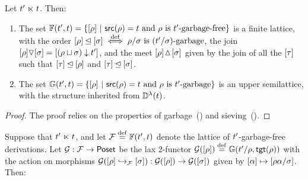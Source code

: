 \begin{proposition}
Let $t' \mathrel{\ltimes} t$. Then:
\begin{enumerate}
\item The set $\mathbb{F}(t', t) = \{{[\rho]} \ |\  \mathsf{src}(\rho) = t \text{ and } \rho \text{ is $t'$-garbage-free}\}$ is a finite lattice,
with the order ${[\rho]} \unlhd {[\sigma]} \overset{\mathrm{def}}{\iff} \rho/\sigma \text{ is $(t'/\sigma)$-garbage}$,
the join ${[\rho]} \triangledown {[\sigma]} = {[(\rho \sqcup \sigma) \downarrow t']}$,
and the meet ${[\rho]} \!\vartriangle\! {[\sigma]}$
given by the join of all the ${[\tau]}$ such that ${[\tau]} \unlhd {[\rho]}$ and ${[\tau]} \unlhd {[\sigma]}$.
\item The set $\mathbb{G}(t', t) = \{{[\rho]} \ |\  \mathsf{src}(\rho) = t \text{ and } \rho \text{ is $t'$-garbage}\}$ is an upper semilattice,
with the structure inherited from $\mathbb{D}^{\lambda}(t)$.
\end{enumerate}
\end{proposition}
\begin{proof}
The proof relies on the properties of garbage~()
and sieving~().
\end{proof}

Suppose that $t' \mathrel{\ltimes} t$,
and let $\mathcal{F} \overset{\mathrm{def}}{=} \mathbb{F}(t', t)$ denote the lattice
of $t'$-garbage-free derivations.
Let $\mathcal{G} : \mathcal{F} \to \mathsf{Poset}$ be the lax 2-functor
$
  \mathcal{G}({[\rho]}) \overset{\mathrm{def}}{=} \mathbb{G}(t'/\rho, \mathsf{tgt}(\rho))
$
with the action on morphisms
$\mathcal{G}({[\rho]} \hookrightarrow_{\mathcal{F}} {[\sigma]}) : \mathcal{G}({[\rho]}) \to \mathcal{G}({[\sigma]})$
given by ${[\alpha]} \mapsto {[\rho\alpha/\sigma]}$.
Then:

